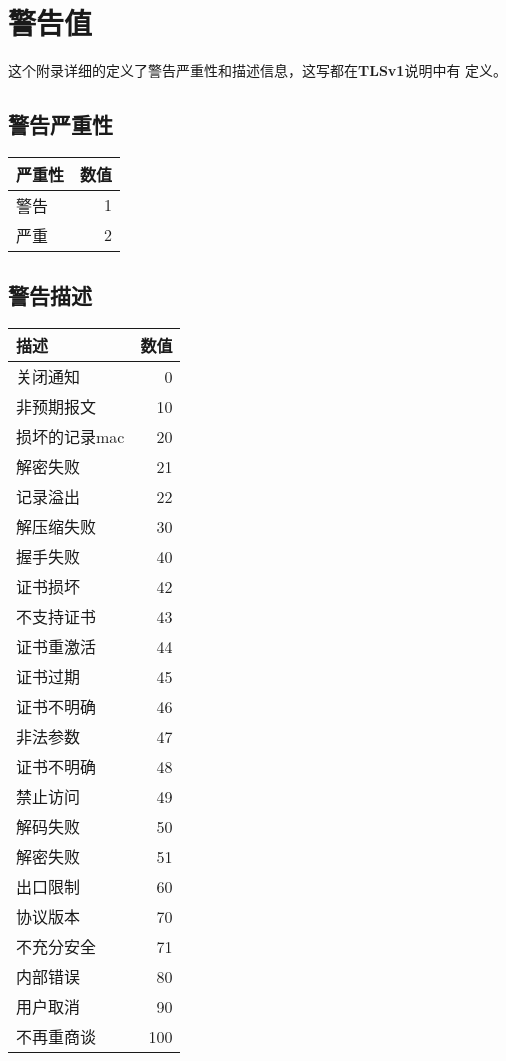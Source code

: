 \documentclass[11pt,dvips]{article}
\newcommand{\bfs}[1]{{\bf{#1}}}
\begin{document}
\pagebreak
\appendix
\section{警告值}

这个附录详细的定义了警告严重性和描述信息，这写都在\bfs{TLSv1}说明中有
定义。\\

\subsection{警告严重性}
\begin{center}
\begin{tabular}{|l|r|}
        \hline
        严重性&数值\\
        \hline
           警告&1\\
           严重&2\\
        \hline
\end{tabular}
\end{center}

\subsection{警告描述}

\begin{center}
\begin{tabular}{|l|r|}
        \hline 
        描述& 数值 \\
        \hline
        关闭通知&0 \\
     非预期报文& 10 \\
 损坏的记录mac & 20\\
        解密失败& 21 \\
        记录溢出& 22 \\
     解压缩失败& 30 \\
        握手失败& 40 \\
        证书损坏& 42\\
     不支持证书& 43 \\
     证书重激活& 44\\
        证书过期& 45 \\
     证书不明确&46\\
        非法参数& 47\\
     证书不明确& 48\\
        禁止访问& 49\\
        解码失败& 50\\
        解密失败& 51\\
        出口限制& 60\\
        协议版本& 70\\
     不充分安全& 71\\
        内部错误& 80\\
        用户取消& 90\\
     不再重商谈& 100\\
        \hline

\end{tabular}

\end{center}
\end{document}
